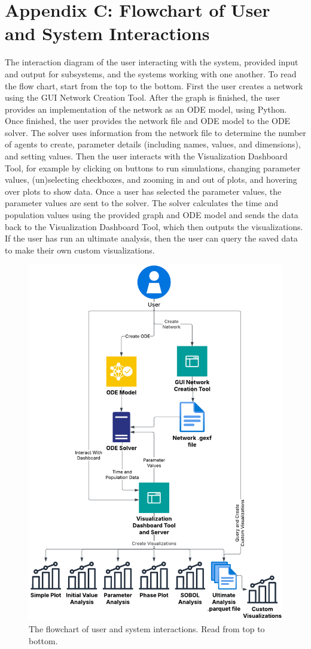 \chapter{Appendix C: Flowchart of User and System Interactions}
\label{AppendixC}

The interaction diagram of the user interacting with the system, provided input and output for subsystems, and the systems working with one another. 
    To read the flow chart, start from the top to the bottom. 
    First the user creates a network using the GUI Network Creation Tool. 
    After the graph is finished, the user provides an implementation of the network as an ODE model, using Python. 
    Once finished, the user provides the network file and ODE model to the ODE solver. 
    The solver uses information from the network file to determine the number of agents to create, parameter details (including names, values, and dimensions), and setting values.
    Then the user interacts with the Visualization Dashboard Tool, for example by clicking on buttons to run simulations, changing parameter values, (un)selecting checkboxes, and zooming in and out of plots, and hovering over plots to show data. 
    Once a user has selected the parameter values, the parameter values are sent to the solver. 
    The solver calculates the time and population values using the provided graph and ODE model and sends the data back to the Visualization Dashboard Tool, which then outputs the visualizations. 
    If the user has run an ultimate analysis, then the user can query the saved data to make their own custom visualizations.
\begin{figure}
    \centering
    \includegraphics[width=0.8\linewidth]{Images/interaction_diagram.pdf}
    \captionsetup{width=1\linewidth}
    \caption{
        The flowchart of user and system interactions. Read from top to bottom. 
    }
    \label{fig:interaction_diagram}
\end{figure} 